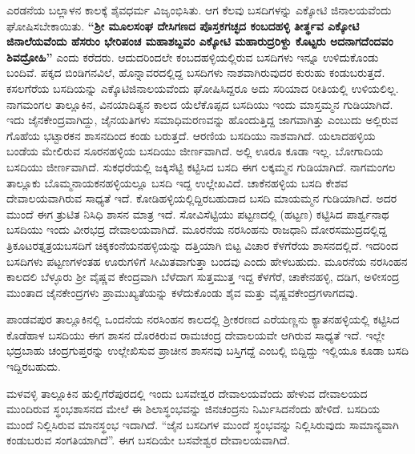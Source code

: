 ಎರಡನೆಯ ಬಲ್ಲಾಳನ ಕಾಲಕ್ಕೆ ಶೈವಧರ್ಮ ವಿಜೃಂಭಿಸಿತು. ಆಗ ಕೆಲವು ಬಸದಿಗಳನ್ನು ಎಕ್ಕೋಟಿ ಜಿನಾಲಯವೆಂದು ಘೋಷಿಸಬೇಕಾಯಿತು. \textbf{“ಶ‍್ರೀ ಮೂಲಸಂಘ ದೇಸಿಗಣದ ಪೊಸ್ತಕಗಚ್ಛದ ಕಂಬದಹಳ್ಳಿ ತೀರ್ತ್ಥವ ಎಕ್ಕೋಟಿ ಜಿನಾಲೆಯವೆಂದು ಹೆಸರುಂ ಭೇರಿಪಂಚ ಮಹಾಶಬ್ದವಂ ಎಕ್ಕೋಟಿ ಮಹಾರುದ್ರರಿಳ್ದು ಕೊಟ್ಟರು ಅದನಾಗದೆಂದವಂ ಶಿವದ್ರೋಹಿ”} ಎಂದು ಕರೆದರು. ಆದುದರಿಂದಲೇ ಕಂಬದಹಳ್ಳಿಯಲ್ಲಿರುವ ಬಸದಿಗಳು ಇನ್ನೂ ಉಳಿದುಕೊಂಡು ಬಂದಿವೆ. ಪಕ್ಕದ ಬಿಂಡಿಗನವಿಲೆ, ಹೊನ್ನಾವರದಲ್ಲಿದ್ದ ಬಸದಿಗಳು ನಾಶವಾಗಿರುವುದರ ಕುರುಹು ಕಂಡುಬರುತ್ತದೆ. ಕಸಲಗೆರೆಯ ಬಸದಿಯನ್ನು ಎಕ್ಕೊಟಿಜಿನಾಲಯವೆಂದು ಘೋಷಿಸಿದ್ದರೂ ಅದು ಸರಿಯಾದ ರೀತಿಯಲ್ಲಿ ಉಳಿಯಲಿಲ್ಲ. ನಾಗಮಂಗಲ ತಾಲ್ಲೂಕಿನ, ವಿನಯಾದಿತ್ಯನ ಕಾಲದ ಯೆಲೆಕೊಪ್ಪದ ಬಸದಿಯು ಇಂದು ಮಾಸ್ತಮ್ಮನ ಗುಡಿಯಾಗಿದೆ. ಇದು ಜೈನಕೇಂದ್ರವಾಗಿದ್ದು, ಜೈನಯತಿಗಳು ಸಮಾಧಿಮರಣವನ್ನು ಹೊಂದುತ್ತಿದ್ದ ಜಾಗವಾಗಿತ್ತು ಎಂಬುದು ಅಲ್ಲಿರುವ ಗೊಹೆಯ ಭಟ್ಟಾರಕನ ಶಾಸನದಿಂದ ಕಂಡು ಬರುತ್ತದೆ. ಆರಣಿಯ ಬಸದಿಯು ನಾಶವಾಗಿದೆ. ಯಲಾದಹಳ್ಳಿಯ ಬಂಡೆಯ ಮೇಲಿರುವ ಸೂರನಹಳ್ಳಿಯ ಬಸದಿಯು ಜೀರ್ಣವಾಗಿದೆ. ಅಲ್ಲಿ ಊರೂ ಕೂಡಾ ಇಲ್ಲ. ಬೋಗಾದಿಯ ಬಸದಿಯು ಜೀರ್ಣವಾಗಿದೆ. ಸುಕಧರೆಯಲ್ಲಿ ಜಕ್ಕಿಸೆಟ್ಟಿ ಕಟ್ಟಿಸಿದ ಬಸದಿ ಈಗ ಲಕ್ಕಮ್ಮನ ಗುಡಿಯಾಗಿದೆ. ನಾಗಮಂಗಲ ತಾಲ್ಲೂಕು ಬೊಮ್ಮನಾಯಕನಹಳ್ಳಿಯಲ್ಲೂ ಬಸದಿ ಇದ್ದ ಉಲ್ಲೇಖವಿದೆ. ಚಾಕೆನಹಳ್ಳಿಯ ಬಸದಿ ಕೇಶವ ದೇವಾಲಯವಾಗಿರುವ ಸಾಧ್ಯತೆ ಇದೆ. ಕೋಡಿಹಳ್ಳಿಯಲ್ಲಿದ್ದಿರಬಹುದಾದ ಬಸದಿ ಮಾಯಮ್ಮನ ಗುಡಿಯಾಗಿದೆ. ಅದರ ಮುಂದೆ ಈಗ ತ್ರುಟಿತ ನಿಸಿಧಿ ಶಾಸನ ಮಾತ್ರ ಇದೆ. ಸೋವಿಸೆಟ್ಟಿಯು ಪಟ್ಟಣದಲ್ಲಿ (ಹಟ್ಟಣ) ಕಟ್ಟಿಸಿದ ಪಾರ್ಶ್ವನಾಥ ಬಸದಿಯು ಇಂದು ವೀರಭದ್ರ ದೇವಾಲಯವಾಗಿದೆ. ಮೂರನೆಯ ನರಸಿಂಹನು ರಾಜಧಾನಿ ದೋರಸಮುದ್ರದಲ್ಲಿದ್ದ ತ್ರಿಕೂಟರತ್ನತ್ರಯಬಸದಿಗೆ ಚಿಕ್ಕಕಂನೆಯನಹಳ್ಳಿಯನ್ನು ದತ್ತಿಯಾಗಿ ಬಿಟ್ಟ ವಿಚಾರ ಕೆಳಗೆರೆಯ ಶಾಸನದಲ್ಲಿದೆ. ಇದರಿಂದ ಬಸದಿಗಳು ಪಟ್ಟಣಗಳಂತಹ ಊರುಗಳಿಗೆ ಸೀಮಿತವಾಗುತ್ತಾ ಬಂದವು ಎಂದು ಹೇಳಬಹುದು. ಮೂರನೆಯ ನರಸಿಂಹನ ಕಾಲದಲಿ ಬೆಳ್ಳೂರು ಶ‍್ರೀ ವೈಷ್ಣವ ಕೇಂದ್ರವಾಗಿ ಬೆಳೆದಾಗ ಸುತ್ತಮುತ್ತ ಇದ್ದ ಕೆಳಗೆರೆ, ಚಾಕೇನಹಳ್ಳಿ, ದಡಿಗ, ಅಳೀಸಂದ್ರ ಮುಂತಾದ ಜೈನಕೇಂದ್ರಗಳು ಪ್ರಾಮುಖ್ಯತೆಯನ್ನು ಕಳೆದುಕೊಂಡು ಶೈವ ಮತ್ತು ವೈಷ್ಣವಕೇಂದ್ರಗಳಾಗದವು.

ಪಾಂಡವಪುರ ತಾಲ್ಲೂಕಿನಲ್ಲಿ ಒಂದನೆಯ ನರಸಿಂಹನ ಕಾಲದಲ್ಲಿ ಶ‍್ರೀಕರಣದ ಎರೆಯಣ್ಣನು ಕ್ಯಾತನಹಳ್ಳಿಯಲ್ಲಿ ಕಟ್ಟಿಸಿದ ಕೊಡೆಹಾಳ ಬಸದಿಯು ಈಗ ಶಾಸನ ದೊರಕಿರುವ ರಾಮಚಂದ್ರ ದೇವಾಲಯವೇ ಆಗಿರುವ ಸಾಧ್ಯತೆ ಇದೆ. ಇಲ್ಲೇ ಭದ್ರಬಾಹು ಚಂದ್ರಗುಪ್ತರನ್ನು ಉಲ್ಲೇಖಿಸುವ ಪ್ರಾಚೀನ ಶಾಸನವು ಬಸ್ತಿಗದ್ದೆ ಎಂಬಲ್ಲಿ ಬಿದ್ದಿದ್ದು ಇಲ್ಲಿಯೂ ಕೂಡಾ ಬಸದಿ ಇದ್ದಿರಬಹುದು.

ಮಳವಳ್ಳಿ ತಾಲ್ಲೂಕಿನ ಹುಲ್ಲಿಗೆರೆಪುರದಲ್ಲಿ ಇಂದು ಬಸವೇಶ್ವರ ದೇವಾಲಯವೆಂದು ಹೇಳುವ ದೇವಾಲಯದ ಮುಂದಿರುವ ಸ್ಥಂಭಶಾಸನದ ಮೇಲೆ ಈ ಶಿಲಾಸ್ಥಂಭವನ್ನು ಜಿನಚಂದ್ರನು ನಿರ್ಮಿಸಿದನೆಂದು ಹೇಳಿದೆ. ಬಸದಿಯ ಮುಂದೆ ನಿಲ್ಲಿಸಿರುವ ಮಾನಸ್ಥಂಭ ಇದಾಗಿದೆ. “ಜೈನ ಬಸದಿಗಳ ಮುಂದೆ ಸ್ಥಂಭವನ್ನು ನಿಲ್ಲಿಸಿರುವುದು ಸಾಮಾನ್ಯವಾಗಿ ಕಂಡುಬರುವ ಸಂಗತಿಯಾಗಿದೆ”. ಈಗ ಬಸದಿಯೇ ಬಸವೇಶ್ವರ ದೇವಾಲಯವಾಗಿದೆ.

